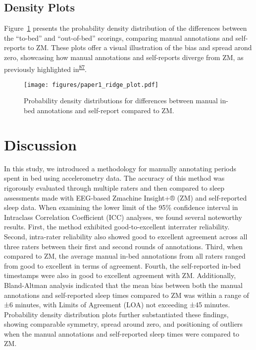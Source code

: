 \documentclass[
  10pt,
]{scrbook}
\begin{document}
\hypertarget{density-plots}{%
\subsection{Density Plots}\label{density-plots}}

Figure~\ref{fig-ridge_plot} presents the probability density
distribution of the differences between the ``to-bed'' and
``out-of-bed'' scorings, comparing manual annotations and self-reports
to ZM. These plots offer a visual illustration of the bias and spread
arond zero, showcasing how manual annotations and self-reports diverge
from ZM, as previously highlighted
in\textsuperscript{\protect\hyperlink{ref-van_hees_estimating_2018}{87}}.

\begin{figure}

{\centering \texttt{[image: figures/paper1\_ridge\_plot.pdf]}

}

\caption{\label{fig-ridge_plot}Probability density distributions for
differences between manual in-bed annotations and self-report compared
to ZM.}

\end{figure}

\hypertarget{discussion}{%
\section{Discussion}\label{discussion}}

In this study, we introduced a methodology for manually annotating
periods spent in bed using accelerometry data. The accuracy of this
method was rigorously evaluated through multiple raters and then
compared to sleep assessments made with EEG-based Zmachine Insight+®
(ZM) and self-reported sleep data. When examining the lower limit of the
95\% confidence interval in Intraclass Correlation Coefficient (ICC)
analyses, we found several noteworthy results. First, the method
exhibited good-to-excellent interrater reliability. Second, intra-rater
reliability also showed good to excellent agreement across all three
raters between their first and second rounds of annotations. Third, when
compared to ZM, the average manual in-bed annotations from all raters
ranged from good to excellent in terms of agreement. Fourth, the
self-reported in-bed timestamps were also in good to excellent agreement
with ZM. Additionally, Bland-Altman analysis indicated that the mean
bias between both the manual annotations and self-reported sleep times
compared to ZM was within a range of ±6 minutes, with Limits of
Agreement (LOA) not exceeding ±45 minutes. Probability density
distribution plots further substantiated these findings, showing
comparable symmetry, spread around zero, and positioning of outliers
when the manual annotations and self-reported sleep times were compared
to ZM.
\end{document}
